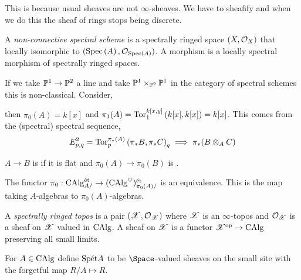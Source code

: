 \documentclass[12pt]{article}
\begin{document}
\begin{rmk}
This is because usual sheaves are not $\infty$-sheaves. We have to sheafify and when we do this the sheaf of rings stops being discrete. 
\end{rmk}

\begin{defn}
A \textit{non-connective spectral scheme} is a spectrally ringed space $(X, \struct{X})$ that locally isomorphic to $(\Spec{A}, \struct{\Spec{A}})$. A morphism is a locally spectral morphism of spectrally ringed spaces.
\end{defn}

\begin{example}
If we take $\P^1 \to \P^2$ a line and take $\P^1 \times_{\P^2} \P^1$ in the category of spectral schemes this is non-classical.  Consider,
\begin{center}
\end{center}
then $\pi_0(A) = k[x]$ and $\pi_1(A) = \Tor{k[x,y]}{1}{k[x]}{k[x]} = k[x]$. This comes from the (spectral) spectral sequence,
\[ E^2_{p,q} = \Tor{\pi_*(A)}{p}{\pi_* B}{\pi_* C}_q \implies \pi_* (B \ot_A C) \]
\end{example}

\begin{defn}
$A \to B$ is \etale if it is flat and $\pi_0(A) \to \pi_0(B)$ is \etale. 
\end{defn}

\begin{theorem}[HA, 7.5.0.6]
The functor $\pi_0 : \CAlg_{A/}^{\et} \to (\CAlg^\heart)^{\et}_{\pi_0(A) /}$ is an equivalence. This is the map taking \etale $A$-algebras to \etale $\pi_0(A)$-algebras. 
\end{theorem}

\begin{defn}
A \textit{spectrally ringed topos} is a pair $(\X, \struct{\X})$ where $\X$ is an $\infty$-topos and $\struct{\X}$ is a sheaf on $\X$ valued in $\CAlg$.  A sheaf on $\X$ is a functor $\X^\op \to \CAlg$ preserving all small limits. 
\end{defn}

\newcommand{\Spet}{\mathrm{Sp}\et}

\begin{defn}
For $A \in \CAlg$ define $\Spet{A}$ to be $\Space$-valued sheaves on the small \etale site with the forgetful map $R / A \mapsto R$. 
\end{defn}
\end{document}
